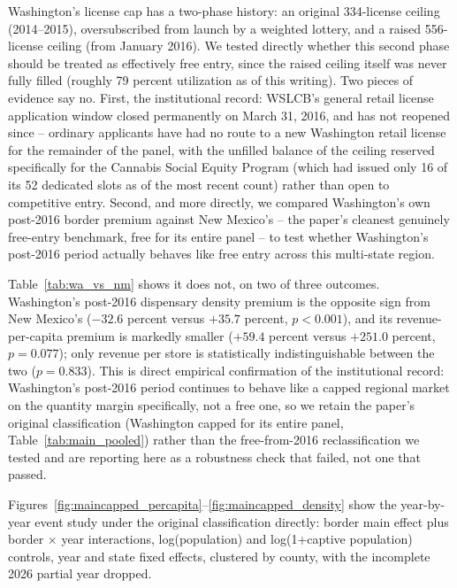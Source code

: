 \documentclass[12pt]{article}
\begin{document}
Washington's license cap has a two-phase history: an original 334-license ceiling (2014--2015), oversubscribed
from launch by a weighted lottery, and a raised 556-license ceiling (from January 2016). We tested directly
whether this second phase should be treated as effectively free entry, since the raised ceiling itself was
never fully filled (roughly 79 percent utilization as of this writing). Two pieces of evidence say no. First,
the institutional record: WSLCB's general retail license application window closed permanently on March 31,
2016, and has not reopened since -- ordinary applicants have had no route to a new Washington retail license
for the remainder of the panel, with the unfilled balance of the ceiling reserved specifically for the
Cannabis Social Equity Program (which had issued only 16 of its 52 dedicated slots as of the most recent
count) rather than open to competitive entry. Second, and more directly, we compared Washington's own
post-2016 border premium against New Mexico's -- the paper's cleanest genuinely free-entry benchmark, free for
its entire panel -- to test whether Washington's post-2016 period actually behaves like free entry across
this multi-state region.



Table~\ref{tab:wa_vs_nm} shows it does not, on two of three outcomes. Washington's post-2016 dispensary density
premium is the opposite sign from New Mexico's ($-32.6$ percent versus $+35.7$ percent, $p<0.001$), and its
revenue-per-capita premium is markedly smaller ($+59.4$ percent versus $+251.0$ percent, $p=0.077$); only
revenue per store is statistically indistinguishable between the two ($p=0.833$). This is direct empirical
confirmation of the institutional record: Washington's post-2016 period continues to behave like a capped
regional market on the quantity margin specifically, not a free one, so we retain the paper's original
classification (Washington capped for its entire panel, Table~\ref{tab:main_pooled}) rather than the
free-from-2016 reclassification we tested and are reporting here as a robustness check that failed, not one
that passed.

Figures~\ref{fig:maincapped_percapita}--\ref{fig:maincapped_density} show the year-by-year event study under
the original classification directly: border main effect plus border $\times$ year interactions,
log(population) and log(1+captive population) controls, year and state fixed effects, clustered by county,
with the incomplete 2026 partial year dropped.
\end{document}
